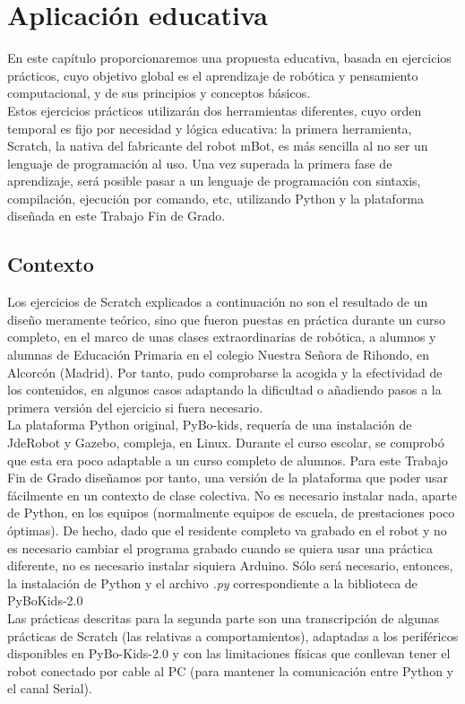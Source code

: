 \chapter{Aplicación educativa}\label{cap:aplicationEducativa}
En este capítulo proporcionaremos una propuesta educativa,  basada en ejercicios prácticos, cuyo objetivo global es el aprendizaje de robótica y pensamiento computacional, y de sus principios y conceptos básicos. \\
Estos ejercicios prácticos utilizarán dos herramientas diferentes, cuyo orden temporal es fijo por necesidad y lógica educativa: la primera herramienta, Scratch, la nativa del fabricante del robot mBot, es más sencilla al no ser un lenguaje de programación al uso. Una vez superada la primera fase de aprendizaje, será posible pasar a un lenguaje de programación con sintaxis, compilación, ejecución por comando, etc, utilizando Python y la plataforma diseñada en este Trabajo Fin de Grado. 
\section{Contexto}\label{sec:contexto}
Los ejercicios de Scratch explicados a continuación no son el resultado de un diseño meramente teórico, sino que fueron puestas en práctica durante un curso completo, en el marco de unas clases extraordinarias de robótica, a alumnos y alumnas de Educación Primaria en el colegio Nuestra Señora de Rihondo, en Alcorcón (Madrid). Por tanto, pudo comprobarse la acogida y la efectividad de los contenidos, en algunos casos adaptando la dificultad o añadiendo pasos a la primera versión del ejercicio si fuera necesario. \\
La plataforma Python original, PyBo-kids, requería de una instalación de JdeRobot y Gazebo, compleja, en Linux. Durante el curso escolar, se comprobó que esta era poco adaptable a un curso  completo de alumnos. Para este Trabajo Fin de Grado diseñamos por tanto, una versión de la plataforma que poder usar fácilmente en un contexto de clase colectiva. No es necesario instalar nada, aparte de Python, en los equipos (normalmente equipos de escuela, de prestaciones poco óptimas). De hecho, dado que el residente completo va grabado en el robot y no es necesario cambiar el programa grabado cuando se quiera usar una práctica diferente, no es necesario instalar siquiera Arduino. Sólo será necesario, entonces, la instalación de Python y el archivo \textit{.py} correspondiente a la biblioteca de PyBoKids-2.0 \\
Las prácticas descritas para la segunda parte son una transcripción de algunas prácticas de Scratch (las relativas a comportamientos), adaptadas a los periféricos disponibles en PyBo-Kids-2.0 y con las limitaciones físicas que conllevan tener el robot conectado por cable al PC (para mantener la comunicación entre Python y el canal Serial). 



